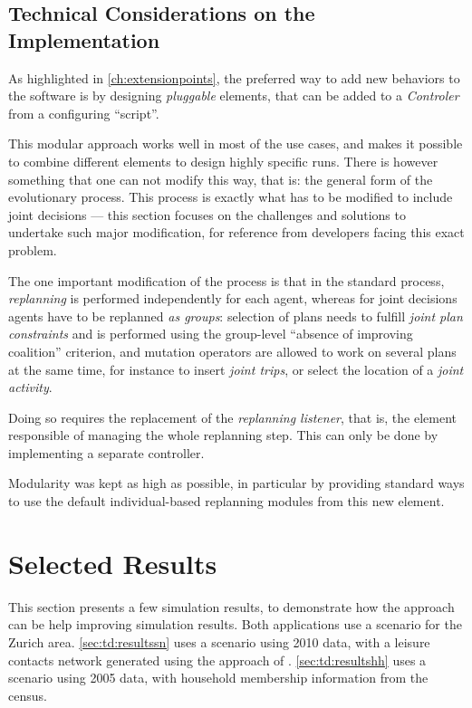 {\subsection{Technical Considerations on the Implementation}
As highlighted in \cref{ch:extensionpoints},
the preferred way to add new behaviors to the \matsim software is
by designing \emph{pluggable} elements,
that can be added to a \emph{Controler} from a configuring ``script''.

This modular approach works well in most of the use cases,
and makes it possible to combine different elements to design highly
specific runs.
There is however something that one can not modify this way,
that is: the general form of the evolutionary process.
This process is exactly what has to be modified to include joint decisions
--- 
this section focuses on the challenges and solutions to undertake such major
modification, for reference from developers facing this exact problem.

The one important modification of the process is that in the standard \matsim process,
\emph{replanning} is performed independently for each agent,
whereas for joint decisions agents have to be replanned \emph{as groups}:
selection of plans needs to fulfill \emph{joint plan constraints}
and is performed using the group-level ``absence of improving coalition''
criterion, and mutation operators are allowed to work on several plans at the same time,
for instance to insert \emph{joint trips}, or select the location of a
\emph{joint activity}.

Doing so requires the replacement of the \emph{replanning listener},
that is, the element responsible of managing the whole replanning step.
This can only be done by implementing a separate controller.

Modularity was kept as high as possible, in particular by providing standard ways
to use the default individual-based replanning modules from this new element.

\section{Selected Results\label{sec:td:results}}
This section presents a few simulation results,
to demonstrate how the approach can be help improving simulation results.
Both applications use a scenario for the Zurich area.
\cref{sec:td:resultssn} uses a scenario using 2010 data,
with a leisure contacts network generated using the approach of .
\cref{sec:td:resultshh} uses a scenario using 2005 data,
with household membership information from the census.


}
